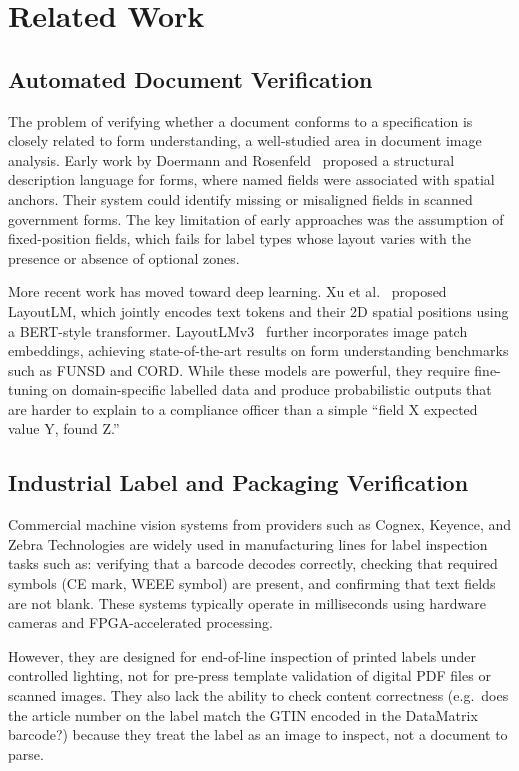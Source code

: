 \chapter{Related Work}
\label{ch:related}

\section{Automated Document Verification}

The problem of verifying whether a document conforms to a specification is closely related
to form understanding, a well-studied area in document image analysis. Early work by
Doermann and Rosenfeld~\cite{doermann1995document} proposed a structural description
language for forms, where named fields were associated with spatial anchors. Their system
could identify missing or misaligned fields in scanned government forms. The key limitation
of early approaches was the assumption of fixed-position fields, which fails for label types
whose layout varies with the presence or absence of optional zones.

More recent work has moved toward deep learning. Xu et al.~\cite{xu2020layoutlm} proposed
LayoutLM, which jointly encodes text tokens and their 2D spatial positions using a BERT-style
transformer. LayoutLMv3~\cite{huang2022layoutlmv3} further incorporates image patch
embeddings, achieving state-of-the-art results on form understanding benchmarks such as
FUNSD and CORD. While these models are powerful, they require fine-tuning on
domain-specific labelled data and produce probabilistic outputs that are harder to explain
to a compliance officer than a simple ``field X expected value Y, found Z.''

\section{Industrial Label and Packaging Verification}

Commercial machine vision systems from providers such as Cognex, Keyence, and Zebra
Technologies are widely used in manufacturing lines for label inspection tasks such as:
verifying that a barcode decodes correctly, checking that required symbols (CE mark, WEEE
symbol) are present, and confirming that text fields are not blank. These systems typically
operate in milliseconds using hardware cameras and FPGA-accelerated processing.

However, they are designed for end-of-line inspection of printed labels under controlled
lighting, not for pre-press template validation of digital PDF files or scanned images. They
also lack the ability to check content correctness (e.g.\ does the article number on the label
match the GTIN encoded in the DataMatrix barcode?) because they treat the label as an
image to inspect, not a document to parse.

